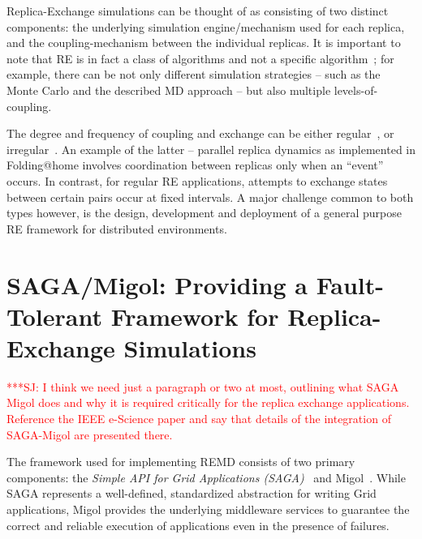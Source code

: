 \documentclass{rspublic}
\newcommand{\jhanote}[1]{ {\textcolor{red} { ***SJ: #1 }}}
\newcommand{\jhanote}[1]{}
\begin{document}
Replica-Exchange simulations can be thought of as consisting of
two distinct components: the underlying simulation engine/mechanism
used for each replica, and the coupling-mechanism between the
individual replicas.  It is important to note that RE is in fact a
class of algorithms and not a specific
algorithm~\citep{dpa-paper}; for example, there can be not only
different simulation strategies -- such as the Monte Carlo and the
described MD approach -- but also multiple levels-of-coupling.  


The degree and frequency of coupling and exchange can be either
regular~\citep{hansmann,Sugita:1999rm}, or
irregular~\citep{SPdynamics,pande_bj03}. An example of the latter --
parallel replica dynamics as implemented in Folding@home
\citep{folding} involves coordination between replicas only when an
``event'' occurs.  In contrast, for regular RE applications, attempts
to exchange states between certain pairs occur at fixed intervals. A
major challenge common to both types however, is the design,
development and deployment of a general purpose RE framework for
distributed environments.



\section{SAGA/Migol: Providing a Fault-Tolerant Framework 
for Replica-Exchange Simulations}\label{sec:sagamigol}

\jhanote{I think we need just a paragraph or two at most, outlining
  what SAGA Migol does and why it is required critically for the
  replica exchange applications. Reference the IEEE e-Science paper
  and say that details of the integration of SAGA-Migol are presented
  there.}


The framework used for implementing REMD consists of two primary
components: the \textit{Simple API for Grid Applications
(SAGA)}~\citep{saga_gfd90} and Migol~\citep{schnorLuckow08}.  While
SAGA represents a well-defined, standardized abstraction for writing
Grid applications, Migol provides the underlying middleware services
to guarantee the correct and reliable exe\-cution of applications even
in the presence of failures.
\end{document}
